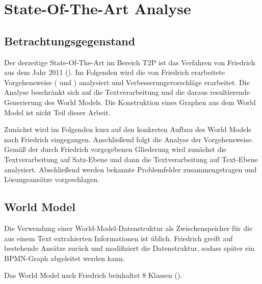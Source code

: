 \section{State-Of-The-Art Analyse}

\subsection{Betrachtungsgegenstand}
Der derzeitige State-Of-The-Art im Bereich \ac{T2P} ist das Verfahren von Friedrich aus dem Jahr 2011 (\cite[vgl.][11]{RIEFER}). Im Folgenden wird die von Friedrich erarbeitete Vorgehensweise (\cite[vgl.][]{FRIEDRICH1} und \cite[vgl.][]{FRIEDRICH2}) analysiert und Verbesserungsvorschläge erarbeitet. Die Analyse beschränkt sich auf die Textverarbeitung und die daraus resultierende Generierung des World Models. Die Konstruktion eines Graphen aus dem World Model ist nicht Teil dieser Arbeit.
\par
Zunächst wird im Folgenden kurz auf den konkreten Aufbau des World Models nach Friedrich eingegangen. Anschließend folgt die Analyse der Vorgehensweise. Gemäß der durch Friedrich vorgegebenen Gliederung wird zunächst die Textverarbeitung auf Satz-Ebene und dann die Textverarbeitung auf Text-Ebene analysiert. Abschließend werden bekannte Problemfelder zusammengetragen und Lösungsansätze vorgeschlagen.

\subsection{World Model}
Die Verwendung einer World-Model-Datenstruktur als Zwischenspeicher für die aus einem Text extrahierten Informationen ist üblich. Friedrich greift auf bestehende Ansätze zurück und modifiziert die Datenstruktur, sodass später ein \ac{BPMN}-Graph abgeleitet werden kann.
\par
Das World Model nach Friedrich beinhaltet 8 Klassen (\cite[vgl.][46]{FRIEDRICH2}). 

